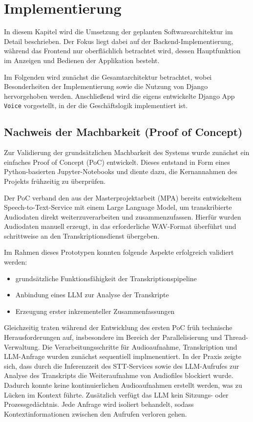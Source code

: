 \chapter{Implementierung}
\label{sec:implementierung}
In diesem Kapitel wird die Umsetzung der geplanten Softwarearchitektur im Detail beschrieben. Der Fokus liegt dabei auf der Backend-Implementierung, während das Frontend nur oberflächlich betrachtet wird, dessen Hauptfunktion im Anzeigen und Bedienen der Applikation besteht. 

Im Folgenden wird zunächst die Gesamtarchitektur betrachtet, wobei Besonderheiten der Implementierung sowie die Nutzung von Django hervorgehoben werden. Anschließend wird die eigens entwickelte Django App \texttt{Voice} vorgestellt, in der die Geschäftslogik implementiert ist.

\section{Nachweis der Machbarkeit (Proof of Concept)}
Zur Validierung der grundsätzlichen Machbarkeit des Systems wurde zunächst ein einfaches Proof of Concept (PoC) entwickelt. Dieses entstand in Form eines Python-basierten Jupyter-Notebooks und diente dazu, die Kernannahmen des Projekts frühzeitig zu überprüfen.

Der PoC verband den aus der Masterprojektarbeit (MPA) bereits entwickeltem Speech-to-Text-Service mit einem Large Language Model, um transkribierte Audiodaten direkt weiterzuverarbeiten und zusammenzufassen. Hierfür wurden Audiodaten manuell erzeugt, in das erforderliche WAV-Format überführt und schrittweise an den Transkriptionsdienst übergeben.

\newpage
Im Rahmen dieses Prototypen konnten folgende Aspekte erfolgreich validiert werden: 

\begin{itemize}
    \item grundsätzliche Funktionsfähigkeit der Transkriptionspipeline
    \item Anbindung eines LLM zur Analyse der Transkripte
    \item Erzeugung erster inkrementeller Zusammenfassungen
\end{itemize}

Gleichzeitig traten während der Entwicklung des ersten PoC früh technische Herausforderungen auf, insbesondere im Bereich der Parallelisierung und Thread-Verwaltung. Die Verarbeitungsschritte für Audioaufnahme, Transkription und LLM-Anfrage wurden zunächst sequentiell implmenentiert. In der Praxis zeigte sich, dass durch die Inferenzzeit des STT-Services sowie des LLM-Aufrufes zur Analyse des Transkripts die Weiteraufnahme von Audiofiles blockiert wurde. Dadurch konnte keine kontinuierlichen Audioaufnahmen erstellt werden, was zu Lücken im Kontext führte. Zusätzlich verfügt das LLM kein Sitzungs- oder Prozessgedächtnis. Jede Anfrage wird isoliert behandelt, sodass Kontextinformationen zwischen den Aufrufen verloren gehen. 

